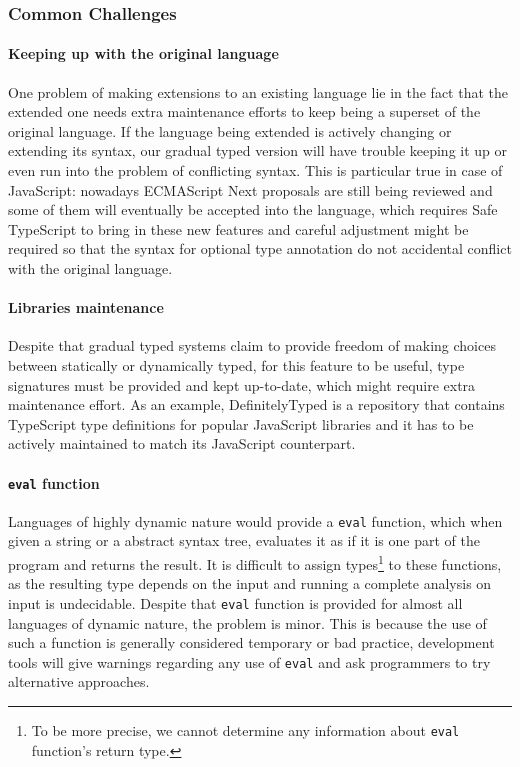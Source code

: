 \subsubsection{Common Challenges}

\paragraph{Keeping up with the original language}
One problem of making extensions to an existing language
lie in the fact that the extended one needs extra maintenance efforts to keep being
a superset of the original language.
If the language being extended is actively changing or extending its syntax,
our gradual typed version will have trouble keeping it up or
even run into the problem of conflicting syntax.
This is particular true in case of JavaScript: nowadays ECMAScript Next
proposals are still being reviewed and some of them will eventually
be accepted into the language,
which requires Safe TypeScript to bring in these new features
and careful adjustment might be required so that the syntax for
optional type annotation do not accidental conflict with the original language.

\paragraph{Libraries maintenance}
Despite that gradual typed systems claim to provide freedom of making choices
between statically or dynamically typed,
for this feature to be useful, type signatures must be provided
and kept up-to-date, which might require extra maintenance effort.
As an example, DefinitelyTyped\cite{yankov2014definitelytyped}
is a repository that contains TypeScript type definitions for popular
JavaScript libraries and it has to be actively maintained to
match its JavaScript counterpart.

\paragraph{\texttt{eval} function}

Languages of highly dynamic nature would provide a \texttt{eval} function,
which when given a string or a abstract syntax tree, evaluates it as
if it is one part of the program and returns the result.
It is difficult to assign types\footnote{To be more precise,
we cannot determine any information about \texttt{eval} function's return type.
} to these functions, as
the resulting type depends on the input and running
a complete analysis on input is undecidable.
Despite that \texttt{eval} function is provided
for almost all languages of dynamic nature, the problem is minor.
This is because the use of such a function is generally considered
temporary or bad practice, development tools will give warnings
regarding any use of \texttt{eval} and ask programmers to try alternative approaches.

